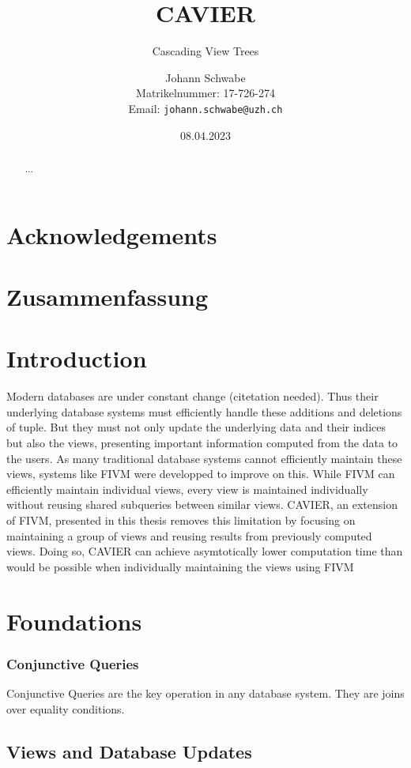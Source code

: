 \documentclass[abstracton,12pt]{scrreprt}
\title{CAVIER}
\subtitle{Cascading View Trees}
\author{
  Johann Schwabe\\[-5pt]
  \scriptsize Matrikelnummer: 17-726-274\\[-5pt]
  \scriptsize Email: \texttt{johann.schwabe@uzh.ch}
}
\date{\vspace*{2cm}08.04.2023}
\begin{document}
\maketitle

\chapter*{Acknowledgements}

\begin{abstract}
  ...
\end{abstract}

\chapter*{Zusammenfassung}

\tableofcontents
\listoffigures
\listoftables

\chapter{Introduction}
Modern databases are under constant change (citetation needed). Thus their underlying database systems must efficiently handle these additions and deletions of tuple. But they must not only update the underlying data and their indices but also the views, presenting important information computed from the data to the users. As many traditional database systems cannot efficiently maintain these views, systems like FIVM were developped to improve on this. While FIVM can efficiently maintain individual views, every view is maintained individually without reusing shared subqueries between similar views. CAVIER, an extension of FIVM, presented in this thesis removes this limitation by focusing on maintaining a group of views and reusing results from previously computed views. Doing so, CAVIER can achieve asymtotically lower computation time than would be possible when individually maintaining the views using FIVM

\chapter{Foundations}
\subsection{Conjunctive Queries}
Conjunctive Queries are the key operation in any database system. They are joins over equality conditions. 
\section{Views and Database Updates}
\end{document}
